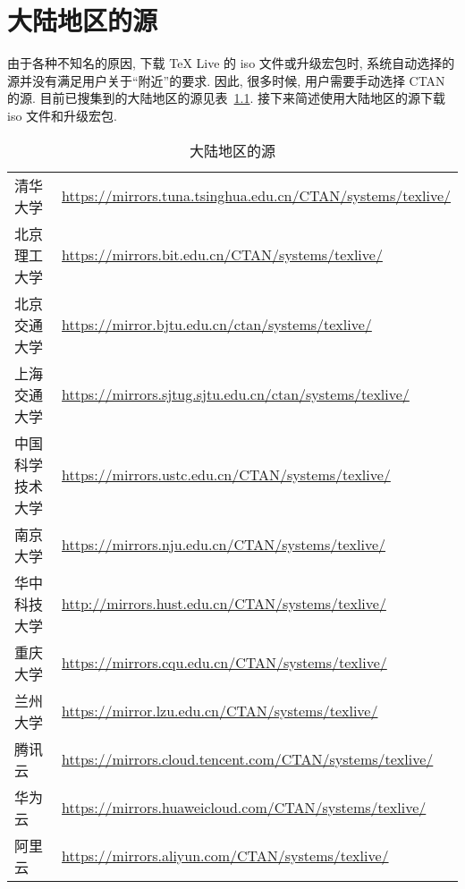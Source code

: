 \chapter{大陆地区的源}\label{chp:appendix:mirror}

由于各种不知名的原因,
下载 \TeX{} Live 的 iso 文件或升级宏包时,
系统自动选择的源并没有满足用户关于``附近''的要求.
因此,
很多时候,
用户需要手动选择 CTAN 的源.
目前已搜集到的大陆地区的源见表~\ref{tab:appendix:mirror}.
接下来简述使用大陆地区的源下载 iso 文件和升级宏包.

\begin{table}
  \centering
  \caption{大陆地区的源}\label{tab:appendix:mirror}
  \begin{tabular}{*{2}{l}}
    \hline\hline
    清华大学 & \url{https://mirrors.tuna.tsinghua.edu.cn/CTAN/systems/texlive/}\\
    北京理工大学 & \url{https://mirrors.bit.edu.cn/CTAN/systems/texlive/}\\
    北京交通大学 & \url{https://mirror.bjtu.edu.cn/ctan/systems/texlive/}\\
    上海交通大学 & \url{https://mirrors.sjtug.sjtu.edu.cn/ctan/systems/texlive/}\\
    中国科学技术大学 & \url{https://mirrors.ustc.edu.cn/CTAN/systems/texlive/}\\
    南京大学 & \url{https://mirrors.nju.edu.cn/CTAN/systems/texlive/}\\
    华中科技大学 & \url{http://mirrors.hust.edu.cn/CTAN/systems/texlive/}\\
    重庆大学 & \url{https://mirrors.cqu.edu.cn/CTAN/systems/texlive/}\\
    兰州大学 & \url{https://mirror.lzu.edu.cn/CTAN/systems/texlive/}\\
    腾讯云 & \url{https://mirrors.cloud.tencent.com/CTAN/systems/texlive/}\\
    华为云 & \url{https://mirrors.huaweicloud.com/CTAN/systems/texlive/}\\
    阿里云 & \url{https://mirrors.aliyun.com/CTAN/systems/texlive/}\\
    \hline\hline
  \end{tabular}
\end{table}

